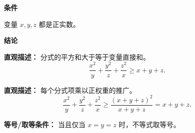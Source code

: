 \begin{statementbox}

\textbf{\textcolor{CStatement}{条件}}
\begin{description}[style=nextline, leftmargin=2.8em, labelsep=0.5em, itemsep=0.35em]
    \item[\textbf{\textcolor{CStatement}{条件 1（正实数）：}}] 变量 $x, y, z$ 都是正实数。
\end{description}

\textbf{\textcolor{CStatement}{结论}}
\begin{description}[style=nextline, leftmargin=2.8em, labelsep=0.5em, itemsep=0.45em]
    \item[\textbf{\textcolor{CStatement}{结论一（三元循环不等式）：}}]
    \textbf{\textcolor{CStatement}{直观描述：}} 分式的平方和大于等于变量直接和。
    \[
        \frac{x^{2}}{y} + \frac{y^{2}}{z} + \frac{z^{2}}{x} \geq x + y + z.
    \]

    \item[\textbf{\textcolor{CStatement}{推广结论（加权推广形式）：}}]
    \textbf{\textcolor{CStatement}{直观描述：}} 每个分式项乘以正权重的推广。
    \[
        \frac{x^{2}}{y} + \frac{y^{2}}{z} + \frac{z^{2}}{x} \geq \frac{(x+y+z)^{2}}{x+y+z} = x+y+z.
    \]
\end{description}

\textbf{\textcolor{CStatement}{等号/取等条件：}} 当且仅当 $x = y = z$ 时，不等式取等号。

\end{statementbox}
